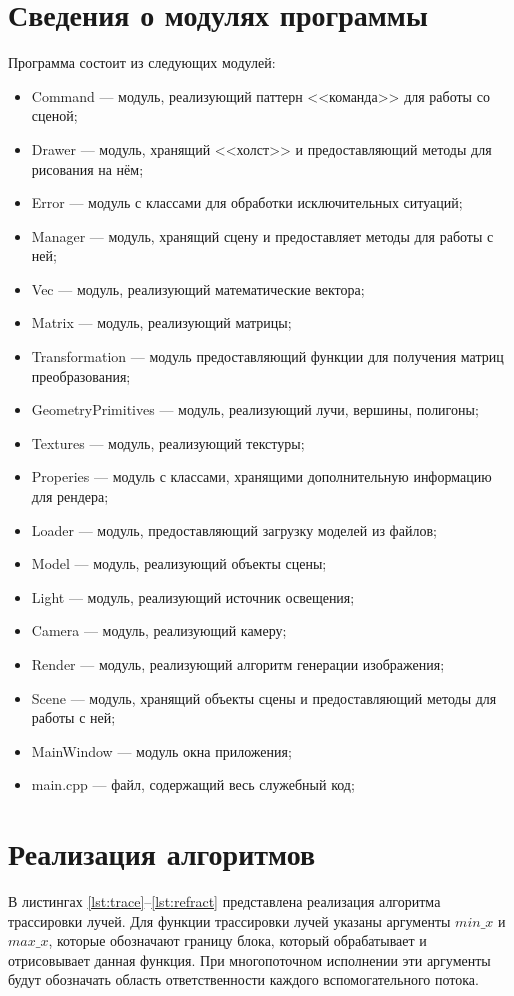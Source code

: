 \section{Сведения о модулях программы}
Программа состоит из следующих	 модулей:
\begin{itemize}[label=---]
	\item Command --- модуль, реализующий паттерн <<команда>> для работы со сценой;
	\item Drawer --- модуль, хранящий <<холст>> и предоставляющий методы для рисования на нём;
	\item Error --- модуль с классами для обработки исключительных ситуаций;
	\item Manager --- модуль, хранящий сцену и предоставляет методы для работы с ней;
	\item Vec --- модуль, реализующий математические вектора;
	\item Matrix --- модуль, реализующий матрицы;
	\item Transformation --- модуль предоставляющий функции для получения матриц преобразования;
	\item GeometryPrimitives --- модуль, реализующий лучи, вершины, полигоны;
	\item Textures --- модуль, реализующий текстуры;
	\item Properies --- модуль с классами, хранящими дополнительную информацию для рендера;
	\item Loader --- модуль, предоставляющий загрузку моделей из файлов;
	\item Model --- модуль, реализующий объекты сцены;
	\item Light --- модуль, реализующий источник освещения;
	\item Camera --- модуль, реализующий камеру;
	\item Render --- модуль, реализующий алгоритм генерации изображения;
	\item Scene --- модуль, хранящий объекты сцены и предоставляющий методы для работы с ней;
	\item MainWindow --- модуль окна приложения;
	\item main.cpp --- файл, содержащий весь служебный код;
\end{itemize}

\section{Реализация алгоритмов}

В листингах \ref{lst:trace}--\ref{lst:refract} представлена реализация алгоритма трассировки лучей. Для функции трассировки лучей указаны аргументы $min\_x$ и $max\_x$, которые обозначают границу блока, который обрабатывает и отрисовывает данная функция. При многопоточном исполнении эти аргументы будут обозначать область ответственности каждого вспомогательного потока.

